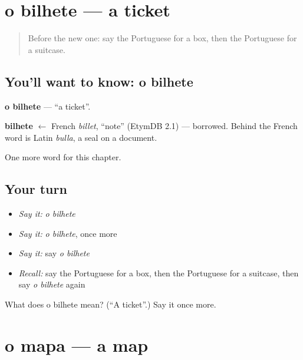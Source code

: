 \section[o bilhete]{o bilhete — a ticket}

\label{lesson:PT-C54-bilhete}



\begin{quote}
Before the new one: say the Portuguese for a box, then the Portuguese for a suitcase.
\end{quote}

\subsection*{You'll want to know: o bilhete}
\textbf{o bilhete} — \textquotedblleft{}a ticket\textquotedblright{}.

\begin{cousinweb}
\textbf{bilhete} $\leftarrow$ French \emph{billet}, \textquotedblleft{}note\textquotedblright{} (EtymDB 2.1) — borrowed. Behind the French word is Latin \emph{bulla}, a seal on a document.
\end{cousinweb}

\begin{grammarlens}[title={What you've built}]
One more word for this chapter.
\end{grammarlens}

\subsection*{Your turn}
\begin{itemize}
\raggedright
  \item \emph{Say it:} \emph{o bilhete}
  \item \emph{Say it:} \emph{o bilhete}, once more
  \item \emph{Say it:} say \emph{o bilhete}
  \item \emph{Recall:} say the Portuguese for a box, then the Portuguese for a suitcase, then say \emph{o bilhete} again
\end{itemize}

\begin{tcolorbox}[breakable,colback=teal!4,colframe=teal!35!black,title={Before you move on}]
What does o bilhete mean? (\textquotedblleft{}A ticket\textquotedblright{}.) Say it once more.
\end{tcolorbox}
\section[o mapa]{o mapa — a map}

